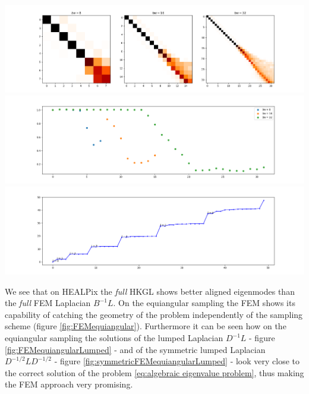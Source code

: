 \begin{minipage}[t!]{.49\textwidth}
	\raggedright
	\center
	\centering
	\includegraphics[width=\textwidth]{../codes/03.FEM_laplacian/equiangular/mass_lumping/BLB/img/linearFEM.png}
	\includegraphics[width=\textwidth]{../codes/03.FEM_laplacian/equiangular/mass_lumping/BLB/img/linearFEM_diagonal.png}	
	\includegraphics[width=\textwidth]{../codes/03.FEM_laplacian/equiangular/mass_lumping/BLB/img/FEM_eigenvalues_32.png}	
\end{minipage}

We see that on HEALPix the \textit{full} HKGL shows better aligned eigenmodes than the \textit{full} FEM Laplacian $B^{-1}L$. On the equiangular sampling the FEM shows its capability of catching the geometry of the problem independently of the sampling scheme (figure \ref{fig:FEMequiangular}). Furthermore it can be seen how on the equiangular sampling the solutions of the lumped Laplacian $D^{-1}L$ - figure \ref{fig:FEMequiangularLumped} - and of the symmetric lumped Laplacian $D^{-1/2}LD^{-1/2}$ - figure \ref{fig:symmetricFEMequiangularLumped} - look very close to the correct solution of the problem \ref{eq:algebraic  eigenvalue problem}, thus making the FEM approach very promising.



